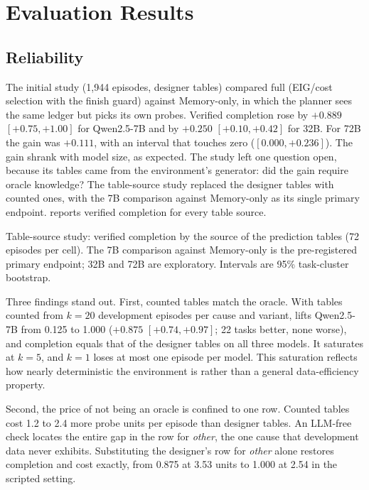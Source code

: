 \section{Evaluation Results}
\label{sec:results}

\subsection{Reliability}
\label{sec:rq-help}
The initial study (1{,}944 episodes, designer tables) compared full \hesp{} (EIG/cost selection with the finish guard) against Memory-only, in which the planner sees the same ledger but picks its own probes. Verified completion rose by $+0.889$ $[+0.75,+1.00]$ for Qwen2.5-7B and by $+0.250$ $[+0.10,+0.42]$ for 32B. For 72B the gain was $+0.111$, with an interval that touches zero ($[0.000,+0.236]$). The gain shrank with model size, as expected. The study left one question open, because its tables came from the environment's generator: did the gain require oracle knowledge? The table-source study replaced the designer tables with counted ones, with the 7B comparison against Memory-only as its single primary endpoint.  reports verified completion for every table source.

\begin{table}[t]
  \caption{Table-source study: verified completion by the source of the prediction tables (72 episodes per cell). The 7B comparison against Memory-only is the pre-registered primary endpoint; 32B and 72B are exploratory. Intervals are 95\% task-cluster bootstrap.}
  \label{tab:v06}
  \centering\small
  \begin{adjustbox}{max width=\textwidth}\end{adjustbox}
\end{table}

Three findings stand out. First, counted tables match the oracle. With tables counted from $k{=}20$ development episodes per cause and variant, \hesp{} lifts Qwen2.5-7B from 0.125 to 1.000 ($+0.875$ $[+0.74,+0.97]$; 22 tasks better, none worse), and completion equals that of the designer tables on all three models. It saturates at $k{=}5$, and $k{=}1$ loses at most one episode per model. This saturation reflects how nearly deterministic the environment is rather than a general data-efficiency property.

Second, the price of not being an oracle is confined to one row. Counted tables cost 1.2 to 2.4 more probe units per episode than designer tables. An LLM-free check locates the entire gap in the row for \textit{other}, the one cause that development data never exhibits. Substituting the designer's row for \textit{other} alone restores completion and cost exactly, from 0.875 at 3.53 units to 1.000 at 2.54 in the scripted setting.


